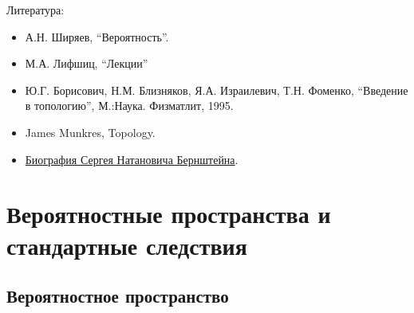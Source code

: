 \documentclass[12pt,a4paper]{article}
\date{}
\begin{document}
    \maketitle

    \listoftodos[TODOs]

    \tableofcontents

    \vspace{2em}

    Литература:
    \begin{itemize}
        \item А.Н. Ширяев, ``Вероятность''.
        \item М.А. Лифшиц, ``Лекции''
        \item Ю.Г. Борисович, Н.М. Близняков, Я.А. Израилевич, Т.Н. Фоменко, ``Введение в топологию'', М.:Наука. Физматлит, 1995.
        \item James Munkres, Topology.
        \item \href{http://mathcenter.spb.ru/nikaan/book/bernstein_bio.pdf}{Биография Сергея Натановича Бернштейна}.
    \end{itemize}

    \section{Вероятностные пространства и стандартные следствия}

    \subsection{Вероятностное пространство}
\end{document}
